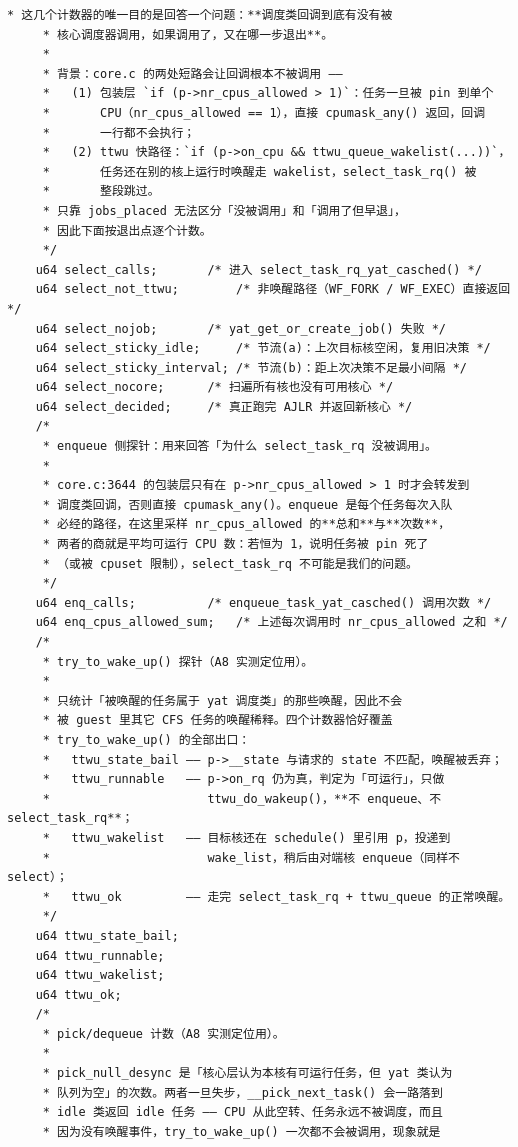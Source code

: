 \documentclass[10pt,a4paper]{article}
\newenvironment{yatpage}{\vspace*{0pt}}{\par}
\begin{document}
\newpage
\begin{yatpage}
\begin{Verbatim}[fontsize=\fontsize{8.2}{9.8}\selectfont]
	 * 这几个计数器的唯一目的是回答一个问题：**调度类回调到底有没有被
	 * 核心调度器调用，如果调用了，又在哪一步退出**。
	 *
	 * 背景：core.c 的两处短路会让回调根本不被调用 ——
	 *   (1) 包装层 `if (p->nr_cpus_allowed > 1)`：任务一旦被 pin 到单个
	 *       CPU（nr_cpus_allowed == 1），直接 cpumask_any() 返回，回调
	 *       一行都不会执行；
	 *   (2) ttwu 快路径：`if (p->on_cpu && ttwu_queue_wakelist(...))`，
	 *       任务还在别的核上运行时唤醒走 wakelist，select_task_rq() 被
	 *       整段跳过。
	 * 只靠 jobs_placed 无法区分「没被调用」和「调用了但早退」，
	 * 因此下面按退出点逐个计数。
	 */
	u64 select_calls;		/* 进入 select_task_rq_yat_casched() */
	u64 select_not_ttwu;		/* 非唤醒路径（WF_FORK / WF_EXEC）直接返回 */
	u64 select_nojob;		/* yat_get_or_create_job() 失败 */
	u64 select_sticky_idle;		/* 节流(a)：上次目标核空闲，复用旧决策 */
	u64 select_sticky_interval;	/* 节流(b)：距上次决策不足最小间隔 */
	u64 select_nocore;		/* 扫遍所有核也没有可用核心 */
	u64 select_decided;		/* 真正跑完 AJLR 并返回新核心 */
	/*
	 * enqueue 侧探针：用来回答「为什么 select_task_rq 没被调用」。
	 *
	 * core.c:3644 的包装层只有在 p->nr_cpus_allowed > 1 时才会转发到
	 * 调度类回调，否则直接 cpumask_any()。enqueue 是每个任务每次入队
	 * 必经的路径，在这里采样 nr_cpus_allowed 的**总和**与**次数**，
	 * 两者的商就是平均可运行 CPU 数：若恒为 1，说明任务被 pin 死了
	 * （或被 cpuset 限制），select_task_rq 不可能是我们的问题。
	 */
	u64 enq_calls;			/* enqueue_task_yat_casched() 调用次数 */
	u64 enq_cpus_allowed_sum;	/* 上述每次调用时 nr_cpus_allowed 之和 */
	/*
	 * try_to_wake_up() 探针（A8 实测定位用）。
	 *
	 * 只统计「被唤醒的任务属于 yat 调度类」的那些唤醒，因此不会
	 * 被 guest 里其它 CFS 任务的唤醒稀释。四个计数器恰好覆盖
	 * try_to_wake_up() 的全部出口：
	 *   ttwu_state_bail —— p->__state 与请求的 state 不匹配，唤醒被丢弃；
	 *   ttwu_runnable   —— p->on_rq 仍为真，判定为「可运行」，只做
	 *                      ttwu_do_wakeup()，**不 enqueue、不 select_task_rq**；
	 *   ttwu_wakelist   —— 目标核还在 schedule() 里引用 p，投递到
	 *                      wake_list，稍后由对端核 enqueue（同样不 select）；
	 *   ttwu_ok         —— 走完 select_task_rq + ttwu_queue 的正常唤醒。
	 */
	u64 ttwu_state_bail;
	u64 ttwu_runnable;
	u64 ttwu_wakelist;
	u64 ttwu_ok;
	/*
	 * pick/dequeue 计数（A8 实测定位用）。
	 *
	 * pick_null_desync 是「核心层认为本核有可运行任务，但 yat 类认为
	 * 队列为空」的次数。两者一旦失步，__pick_next_task() 会一路落到
	 * idle 类返回 idle 任务 —— CPU 从此空转、任务永远不被调度，而且
	 * 因为没有唤醒事件，try_to_wake_up() 一次都不会被调用，现象就是
\end{Verbatim}
\end{yatpage}
\end{document}
